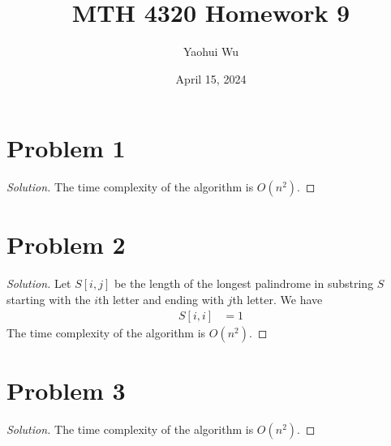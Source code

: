 \documentclass[12pt]{article}
\title{MTH 4320 Homework 9}
\author{Yaohui Wu}
\date{April 15, 2024}
\newenvironment*{solution}{\begin{proof}[Solution]}{\end{proof}}
\begin{document}
\maketitle
\section*{Problem 1}
\begin{solution}
    The time complexity of the algorithm is \(O(n^2)\).
\end{solution}
\section*{Problem 2}
\begin{solution}
    Let \(S[i,j]\) be the length of the longest palindrome in substring \(S\)
    starting with the \(i\)th letter and ending with \(j\)th letter. We have
    \begin{align*}
        S[i,i] &= 1
    \end{align*}
    The time complexity of the algorithm is \(O(n^2)\).
\end{solution}
\section*{Problem 3}
\begin{solution}
    The time complexity of the algorithm is \(O(n^2)\).
\end{solution}
\end{document}
